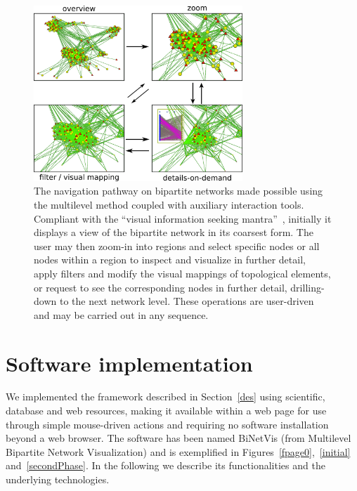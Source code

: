 \documentclass[runningheads]{llncs}
\begin{document}
\begin{figure}\centering
 \includegraphics[width=0.7\textwidth]{fnav____}
  \caption{The navigation pathway on bipartite networks made possible using the multilevel method coupled with auxiliary interaction tools.
  Compliant with the ``visual information seeking mantra''~\cite{shneiderman1996eyes}, initially it displays a view of the bipartite network in its coarsest form.
  The user may then zoom-in into regions and select specific nodes or all nodes within a region to inspect and visualize in further detail, apply filters and modify the visual mappings of topological elements, or request to see the corresponding nodes in further detail, drilling-down to the next network level.
  These operations are user-driven and may be carried out in any sequence.
  }\label{fnav}
\end{figure}

\noindent 
\section{Software implementation}\label{sof}
We implemented the framework described in Section~\ref{des} using scientific,
database and web resources, making it available within a web page
for use through simple mouse-driven actions and requiring no software installation beyond a web browser. %
The software has been named BiNetVis (from Multilevel Bipartite Network Visualization)
and is exemplified in Figures~\ref{fpage0},~\ref{initial} and~\ref{secondPhase}.
In the following we describe its functionalities and the underlying technologies.
\end{document}
